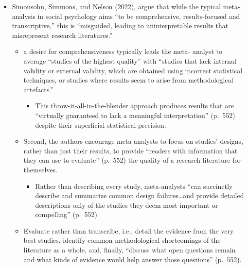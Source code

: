 \documentclass{article}
\providecommand{\tightlist}{%
  \setlength{\itemsep}{0pt}\setlength{\parskip}{0pt}}
\begin{document}
\begin{itemize}
\item
  Simonsohn, Simmons, and Nelson (2022), argue that while the typical
  meta-analysis in social psychology aims ``to be comprehensive,
  results-focused and transcriptive,'' this is ``misguided, leading to
  uninterpretable results that misrepresent research literatures.''

  \begin{itemize}
  \item
    a desire for comprehensiveness typically leads the meta- analyst to
    average ``studies of the highest quality'' with ``studies that lack
    internal validity or external validity, which are obtained using
    incorrect statistical techniques, or studies where results seem to
    arise from methodological artefacts.''

    \begin{itemize}
    \tightlist
    \item
      This throw-it-all-in-the-blender approach produces results that
      are ``virtually guaranteed to lack a meaningful interpretation''
      (p.~552) despite their superficial statistical precision.
    \end{itemize}
  \item
    Second, the authors encourage meta-analysts to focus on studies'
    designs, rather than just their results, to provide ``readers with
    information that they can use to evaluate'' (p.~552) the quality of
    a research literature for themselves.

    \begin{itemize}
    \tightlist
    \item
      Rather than describing every study, meta-analysts ``can succinctly
      describe and summarize common design failures\ldots and provide
      detailed descriptions only of the studies they deem most important
      or compelling'' (p.~552)
    \end{itemize}
  \item
    Evaluate rather than transcribe, i.e., detail the evidence from the
    very best studies, identify common methodological shortcomings of
    the literature as a whole, and, finally, ``discuss what open
    questions remain and what kinds of evidence would help answer those
    questions'' (p.~552).
  \end{itemize}
\end{itemize}
\end{document}
